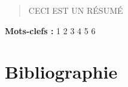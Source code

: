\documentclass[a4paper,12pt]{article}
\newcommand{\zitat}[2]{\#Citation(#2)\#}
\begin{document}
%
%




\newpage
\begin{abstract}
CECI EST UN RÉSUMÉ
\end{abstract}
\bigskip
\textbf{Mots-clefs :} 1 2 3 4 5 6

\newpage
\nocite{*}
\section{Bibliographie}
\printbibliography
\end{document}
